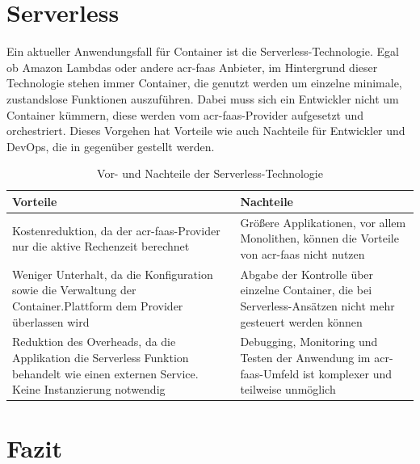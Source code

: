 \section{Serverless}
\label{sec:aktuellesServerless}

Ein aktueller Anwendungsfall für Container ist die Serverless-Technologie. Egal ob Amazon Lambdas oder andere \gls{acr-faas} Anbieter, im Hintergrund dieser Technologie stehen immer Container, die genutzt werden um einzelne minimale, zustandslose Funktionen auszuführen. Dabei muss sich ein Entwickler nicht um Container kümmern, diese werden vom \gls{acr-faas}-Provider aufgesetzt und orchestriert. Dieses Vorgehen hat Vorteile wie auch Nachteile für Entwickler und DevOps, die in  gegenüber gestellt werden.

\begin{table}[h]
	\renewcommand{\arraystretch}{2.5}
	\begin{center}
		\begin{tabu} to 0.9
			\toprule
			Vorteile & Nachteile\\
			\midrule
			Kostenreduktion, da der \gls{acr-faas}-Provider nur die aktive Rechenzeit berechnet & Größere Applikationen, vor allem Monolithen, können die Vorteile von \gls{acr-faas} nicht nutzen\\
			Weniger Unterhalt, da die Konfiguration sowie die Verwaltung der Container.Plattform dem Provider überlassen wird & Abgabe der Kontrolle über einzelne Container, die bei Serverless-Ansätzen nicht mehr gesteuert werden können\\
			Reduktion des Overheads, da die Applikation die Serverless Funktion behandelt wie einen externen Service. Keine Instanzierung notwendig & Debugging, Monitoring und Testen der Anwendung im \gls{acr-faas}-Umfeld ist komplexer und teilweise unmöglich\\
			\bottomrule
		\end{tabu}
		\caption{Vor- und Nachteile der Serverless-Technologie \citep{ContainersVsServerlessComputing}}
		\label{tab:serverlessAdvantagesDisadvantages}
	\end{center}
\end{table}

\pagebreak

\section{Fazit}
\label{sec:aktuellesFazit}

